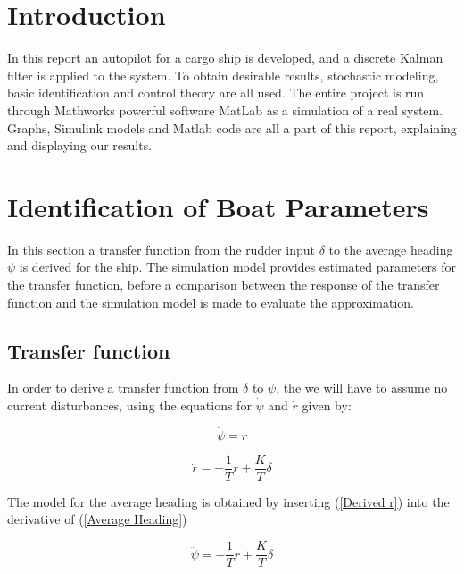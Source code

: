 \section*{Introduction}
In this report an autopilot for a cargo ship is developed, and a discrete Kalman filter is applied to the system. To obtain desirable results, stochastic modeling, basic identification and control theory are all used. The entire project is run through Mathworks powerful software MatLab as a simulation of a real system. Graphs, Simulink models and Matlab code are all a part of this report, explaining and displaying our results.


\section{Identification of Boat Parameters}
In this section a transfer function from the rudder input $\delta$ to the average heading $\psi$ is derived for the ship. The simulation model provides estimated parameters for the transfer function, before a comparison between the response of the transfer function and the simulation model is made to evaluate the approximation.


\subsection{Transfer function}
In order to derive a transfer function from $\delta$ to $\psi$, the we will have to assume no current disturbances, using the equations for $\dot{\psi}$ and $\dot{r}$ given by:

\begin{equation}\label{Average Heading}
    \dot{\psi} = r
\end{equation}

\begin{equation}\label{Derived r}
    \dot r =  - \frac{1}{T}r + \frac{K}{T}\delta  
\end{equation}

The model for the average heading is obtained by inserting (\ref{Derived r}) into the derivative of (\ref{Average Heading})

\begin{equation}\label{dDerived psi}
    \ddot \psi  =  - \frac{1}{T}r + \frac{K}{T}\delta 
\end{equation}

